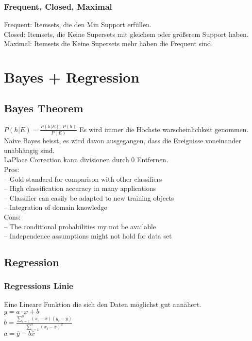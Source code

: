 \documentclass[a4paper]{scrartcl}
\begin{document}
\subsubsection{Frequent, Closed, Maximal}
Frequent: Itemsets, die den Min Support erfüllen.\\
Closed: Itemsets, die Keine Supersets mit gleichem oder größerem Support haben.\\
Maximal: Itemsets die Keine Supersets mehr haben die Frequent sind.\\

\section{Bayes + Regression}
\subsection{Bayes Theorem}
$P(h|E)=\frac{P(h|E)\cdot P(h)}{P(E)} $
Es wird immer die Höchste warscheinlichkeit genommen.\\
Naive Bayes heisst, es wird davon ausgegangen, dass die Ereignisse voneinander unabhängig sind.\\
LaPlace Correction kann divisionen durch 0 Entfernen.\\

Pros:\\
– Gold standard for comparison with other classifiers\\
– High classification accuracy in many applications\\
– Classifier can easily be adapted to new training objects\\
– Integration of domain knowledge\\

Cons:\\
– The conditional probabilities my not be available\\
– Independence assumptions might not hold for data set\\
\pagebreak
\subsection{Regression}
\subsubsection{Regressions Linie}
Eine Lineare Funktion die sich den Daten möglichst gut annähert.\\
$ y = a\cdot x + b$\\
$b = \frac{\sum\limits^n _{i = 1} (x_i - \overline{x})(y_i - \overline{y})}{\sum\limits^n _{i = 1} (x_i - \overline{x})^2}$\\
$a = \overline{y} - b\overline{x} $
\end{document}
